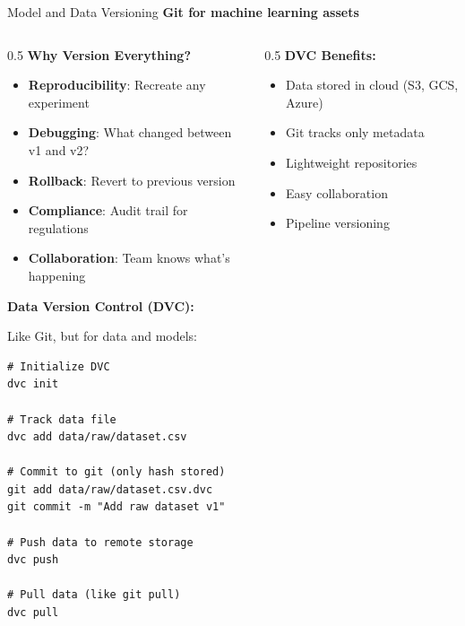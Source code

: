 \begin{frame}{Model and Data Versioning}
\textbf{Git for machine learning assets}

\begin{columns}
\begin{column}{0.5\textwidth}
\textbf{Why Version Everything?}

\begin{itemize}
\item \textbf{Reproducibility}: Recreate any experiment
\item \textbf{Debugging}: What changed between v1 and v2?
\item \textbf{Rollback}: Revert to previous version
\item \textbf{Compliance}: Audit trail for regulations
\item \textbf{Collaboration}: Team knows what's happening
\end{itemize}

\vspace{0.3cm}

\textbf{Data Version Control (DVC):}

Like Git, but for data and models:

\begin{verbatim}
# Initialize DVC
dvc init

# Track data file
dvc add data/raw/dataset.csv

# Commit to git (only hash stored)
git add data/raw/dataset.csv.dvc
git commit -m "Add raw dataset v1"

# Push data to remote storage
dvc push

# Pull data (like git pull)
dvc pull
\end{verbatim}
\end{column}

\begin{column}{0.5\textwidth}
\textbf{DVC Benefits:}

\begin{itemize}
\item Data stored in cloud (S3, GCS, Azure)
\item Git tracks only metadata
\item Lightweight repositories
\item Easy collaboration
\item Pipeline versioning
\end{itemize}

\vspace{0.2cm}


\end{column}
\end{columns}
\end{frame}
